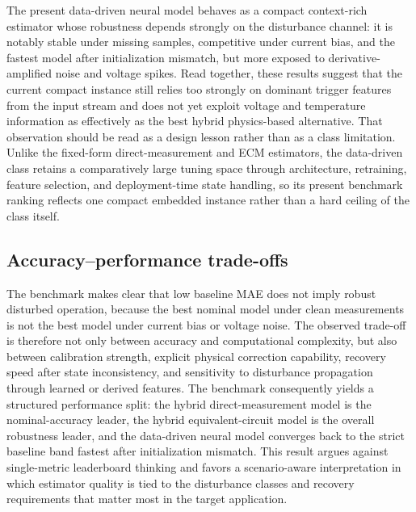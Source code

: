 \documentclass[review]{elsarticle}
\begin{document}
The present data-driven neural model behaves as a compact context-rich estimator whose robustness depends strongly on the disturbance channel: it is notably stable under missing samples, competitive under current bias, and the fastest model after initialization mismatch, but more exposed to derivative-amplified noise and voltage spikes. Read together, these results suggest that the current compact instance still relies too strongly on dominant trigger features from the input stream and does not yet exploit voltage and temperature information as effectively as the best hybrid physics-based alternative. That observation should be read as a design lesson rather than as a class limitation. Unlike the fixed-form direct-measurement and ECM estimators, the data-driven class retains a comparatively large tuning space through architecture, retraining, feature selection, and deployment-time state handling, so its present benchmark ranking reflects one compact embedded instance rather than a hard ceiling of the class itself.

\subsection{Accuracy--performance trade-offs}
The benchmark makes clear that low baseline MAE does not imply robust disturbed operation, because the best nominal model under clean measurements is not the best model under current bias or voltage noise. The observed trade-off is therefore not only between accuracy and computational complexity, but also between calibration strength, explicit physical correction capability, recovery speed after state inconsistency, and sensitivity to disturbance propagation through learned or derived features. The benchmark consequently yields a structured performance split: the hybrid direct-measurement model is the nominal-accuracy leader, the hybrid equivalent-circuit model is the overall robustness leader, and the data-driven neural model converges back to the strict baseline band fastest after initialization mismatch. This result argues against single-metric leaderboard thinking and favors a scenario-aware interpretation in which estimator quality is tied to the disturbance classes and recovery requirements that matter most in the target application.
\end{document}
